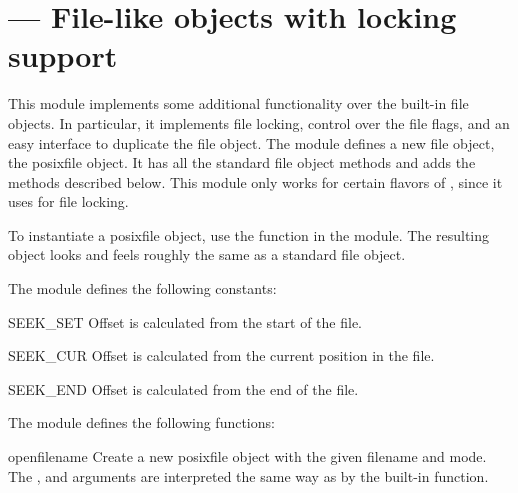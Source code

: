 \section{ ---
         File-like objects with locking support}





This module implements some additional functionality over the built-in
file objects.  In particular, it implements file locking, control over
the file flags, and an easy interface to duplicate the file object.
The module defines a new file object, the posixfile object.  It
has all the standard file object methods and adds the methods
described below.  This module only works for certain flavors of
\UNIX, since it uses  for file locking.%

To instantiate a posixfile object, use the  function
in the  module.  The resulting object looks and
feels roughly the same as a standard file object.

The  module defines the following constants:


\begin{datadesc}{SEEK_SET}
Offset is calculated from the start of the file.
\end{datadesc}

\begin{datadesc}{SEEK_CUR}
Offset is calculated from the current position in the file.
\end{datadesc}

\begin{datadesc}{SEEK_END}
Offset is calculated from the end of the file.
\end{datadesc}

The  module defines the following functions:


\begin{funcdesc}{open}{filename}
 Create a new posixfile object with the given filename and mode.  The
 ,  and  arguments are
 interpreted the same way as by the built-in 
 function.
\end{funcdesc}


